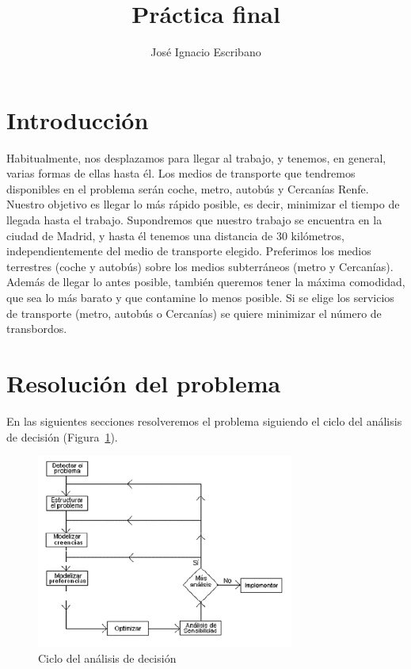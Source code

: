 \documentclass[12pt,a4paper,twoside,openright,titlepage,final]{article}
\author{José Ignacio Escribano}
\title{Práctica final}
\begin{document}
\setcounter{page}{1}


\listoffigures
\thispagestyle{empty}
\newpage

\listoftables
\thispagestyle{empty}
\newpage

\tableofcontents
\thispagestyle{empty}
\newpage


\setcounter{page}{1}

\section{Introducción}

Habitualmente, nos desplazamos para llegar al trabajo, y tenemos, en general, varias formas de ellas hasta él. Los medios de transporte que tendremos disponibles en el problema serán coche, metro, autobús y Cercanías Renfe. Nuestro objetivo es llegar lo más rápido posible, es decir, minimizar el tiempo de llegada hasta el trabajo. Supondremos que nuestro trabajo se encuentra en la ciudad de Madrid, y hasta él tenemos una distancia de 30 kilómetros, independientemente del medio de transporte elegido. Preferimos los medios terrestres (coche y autobús) sobre los medios subterráneos (metro y Cercanías). Además de llegar lo antes posible, también queremos tener la máxima comodidad, que sea lo más barato y que contamine lo menos posible. Si se elige los servicios de transporte (metro, autobús o Cercanías) se quiere minimizar el número de transbordos.\\

\section{Resolución del problema}

En las siguientes secciones resolveremos el problema siguiendo el ciclo del análisis de decisión (Figura~\ref{fig:ciclo}).

\begin{figure}[tbph!]
	\centering
	\includegraphics[width=0.5\linewidth]{imagenes/ciclo}
	\caption{Ciclo del análisis de decisión}
	\label{fig:ciclo}
\end{figure}
\end{document}
